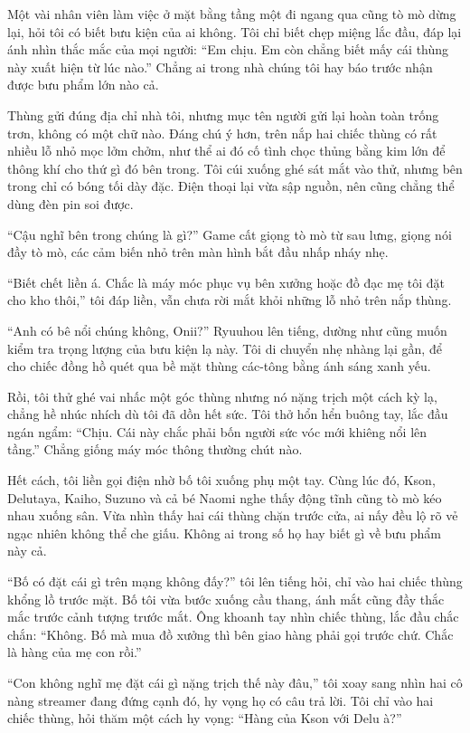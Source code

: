 ﻿\documentclass[../main.tex]{subfiles}
\begin{document}
Một vài nhân viên làm việc ở mặt bằng tầng một đi ngang qua cũng tò mò dừng lại, hỏi tôi có biết bưu kiện của ai không. Tôi chỉ biết chẹp miệng lắc đầu, đáp lại ánh nhìn thắc mắc của mọi người: ``Em chịu. Em còn chẳng biết mấy cái thùng này xuất hiện từ lúc nào.'' Chẳng ai trong nhà chúng tôi hay báo trước nhận được bưu phẩm lớn nào cả.

Thùng gửi đúng địa chỉ nhà tôi, nhưng mục tên người gửi lại hoàn toàn trống trơn, không có một chữ nào. Đáng chú ý hơn, trên nắp hai chiếc thùng có rất nhiều lỗ nhỏ mọc lởm chởm, như thể ai đó cố tình chọc thủng bằng kim lớn để thông khí cho thứ gì đó bên trong. Tôi cúi xuống ghé sát mắt vào thử, nhưng bên trong chỉ có bóng tối dày đặc. Điện thoại lại vừa sập nguồn, nên cũng chẳng thể dùng đèn pin soi được.

``Cậu nghĩ bên trong chúng là gì?'' Game cất giọng tò mò từ sau lưng, giọng nói đầy tò mò, các cảm biến nhỏ trên màn hình bắt đầu nhấp nháy nhẹ.

``Biết chết liền á. Chắc là máy móc phục vụ bên xưởng hoặc đồ đạc mẹ tôi đặt cho kho thôi,'' tôi đáp liền, vẫn chưa rời mắt khỏi những lỗ nhỏ trên nắp thùng.

``Anh có bê nổi chúng không, Onii?'' Ryuuhou lên tiếng, dường như cũng muốn kiểm tra trọng lượng của bưu kiện lạ này. Tôi di chuyển nhẹ nhàng lại gần, để cho chiếc đồng hồ quét qua bề mặt thùng các-tông bằng ánh sáng xanh yếu.

Rồi, tôi thử ghé vai nhấc một góc thùng nhưng nó nặng trịch một cách kỳ lạ, chẳng hề nhúc nhích dù tôi đã dồn hết sức. Tôi thở hổn hển buông tay, lắc đầu ngán ngẩm: ``Chịu. Cái này chắc phải bốn người sức vóc mới khiêng nổi lên tầng.'' Chẳng giống máy móc thông thường chút nào.

Hết cách, tôi liền gọi điện nhờ bố tôi xuống phụ một tay. Cùng lúc đó, Kson, Delutaya, Kaiho, Suzuno và cả bé Naomi nghe thấy động tĩnh cũng tò mò kéo nhau xuống sân. Vừa nhìn thấy hai cái thùng chặn trước cửa, ai nấy đều lộ rõ vẻ ngạc nhiên không thể che giấu. Không ai trong số họ hay biết gì về bưu phẩm này cả.

``Bố có đặt cái gì trên mạng không đấy?'' tôi lên tiếng hỏi, chỉ vào hai chiếc thùng khổng lồ trước mặt. Bố tôi vừa bước xuống cầu thang, ánh mắt cũng đầy thắc mắc trước cảnh tượng trước mắt. Ông khoanh tay nhìn chiếc thùng, lắc đầu chắc chắn: ``Không. Bố mà mua đồ xưởng thì bên giao hàng phải gọi trước chứ. Chắc là hàng của mẹ con rồi.''

``Con không nghĩ mẹ đặt cái gì nặng trịch thế này đâu,'' tôi xoay sang nhìn hai cô nàng streamer đang đứng cạnh đó, hy vọng họ có câu trả lời. Tôi chỉ vào hai chiếc thùng, hỏi thăm một cách hy vọng: ``Hàng của Kson với Delu à?''
\end{document}
